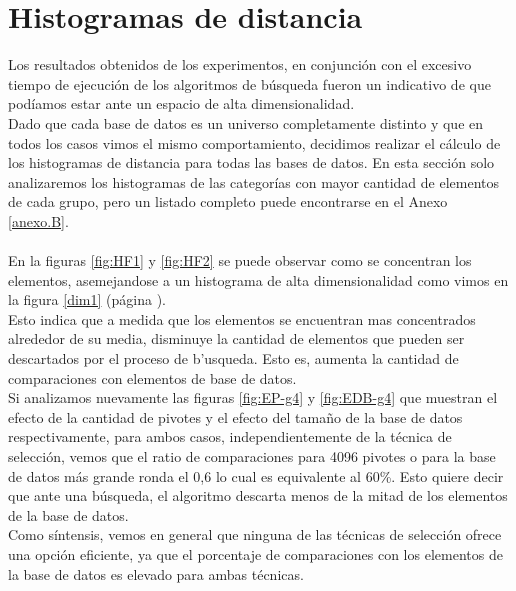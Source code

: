 \section{Histogramas de distancia}
 
Los resultados obtenidos de los experimentos, en conjunci\'on con el excesivo tiempo de ejecuci\'on de los algoritmos de b\'usqueda fueron un indicativo de que pod\'iamos estar ante un espacio de alta dimensionalidad.\\

Dado que cada base de datos es un universo completamente distinto y que en todos los casos vimos el mismo comportamiento, decidimos realizar el c\'alculo de los histogramas de distancia para todas las bases de datos. En esta secci\'on solo analizaremos los histogramas de las categor\'ias con mayor cantidad de elementos de cada grupo, pero un listado completo puede encontrarse en el Anexo \ref{anexo.B}.\\\\

En la figuras \ref{fig:HF1} y \ref{fig:HF2} se puede observar como se concentran los elementos, asemejandose a un histograma de alta dimensionalidad como vimos en la figura \ref{dim1} (p\'agina \pageref{dim1}).\\

Esto indica que a medida que los elementos se encuentran mas concentrados alrededor de su media, disminuye la cantidad de elementos que pueden ser descartados por el proceso de b'usqueda. Esto es, aumenta la cantidad de comparaciones con elementos de base de datos.\\

Si analizamos nuevamente las figuras \ref{fig:EP-g4} y \ref{fig:EDB-g4} que muestran el efecto de la cantidad de pivotes y el efecto del tama\~no de la base de datos respectivamente, para ambos casos, independientemente de la t\'ecnica de selecci\'on, vemos que el ratio de comparaciones para 4096 pivotes o para la base de datos m\'as grande ronda el 0,6 lo cual es equivalente al 60\%. Esto quiere decir que ante una b\'usqueda, el algoritmo descarta menos de la mitad de los elementos de la base de datos.\\

Como s\'intensis, vemos en general que ninguna de las t\'ecnicas de selecci\'on ofrece una opci\'on eficiente, ya que el porcentaje de comparaciones con los elementos de la base de datos es elevado para ambas t\'ecnicas.\\


